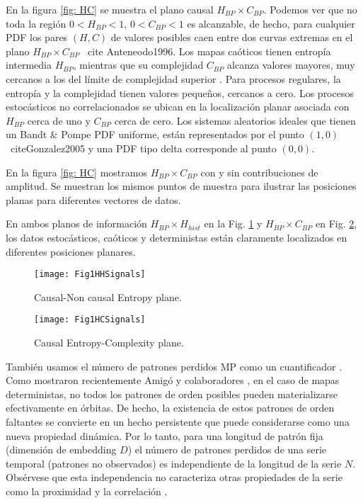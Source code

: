 En la figura \ref{fig: HC} se muestra el plano causal $H_{BP} \times C_{BP}$.
Podemos ver que no toda la región $0 < H_{BP} < 1$, $0 < C_{BP} < 1$ es alcanzable, de hecho, para cualquier PDF los pares $(H, C)$ de valores posibles caen entre dos curvas extremas en el plano $H_{BP} \times C_{BP}$ \ cite {Anteneodo1996}.
Los mapas caóticos tienen entropía intermedia $H_{BP}$, mientras que su complejidad $C_{BP}$ alcanza valores mayores, muy cercanos a los del límite de complejidad superior \cite{Rosso2007, Olivares2012}.
Para procesos regulares, la entropía y la complejidad tienen valores pequeños, cercanos a cero.
Los procesos estocásticos no correlacionados se ubican en la localización planar asociada con $H_{BP}$ cerca de uno y $C_{BP}$ cerca de cero.
Los sistemas aleatorios ideales que tienen un Bandt \& Pompe PDF uniforme, están representados por el punto $(1,0)$ \ cite{Gonzalez2005} y una PDF tipo delta corresponde al punto $(0,0)$.

En la figura \ref{fig: HC} mostramos $H_{BP} \times C_{BP}$ con y sin contribuciones de amplitud.
Se muestran los mismos puntos de muestra para ilustrar las posiciones planas para diferentes vectores de datos.

En ambos planos de información $H_ {BP} \times H_ {hist}$ en la Fig. \ref{fig:HH} y $H_{BP} \times C_{BP}$ en Fig. \ref{fig:HC}, los datos estocásticos, caóticos y deterministas están claramente localizados en diferentes posiciones planares.

\begin{figure}[htpb]
	\centering	
	\texttt{[image: Fig1HHSignals]}
	\caption{Causal-Non causal Entropy plane.}
	\label{fig:HH}
\end{figure}

\begin{figure}[htpb]
	\centering		
	\texttt{[image: Fig1HCSignals]}
	\caption{Causal Entropy-Complexity plane.}
	\label{fig:HC}
\end{figure}

También usamos el número de patrones perdidos MP como un cuantificador \cite {Rosso2012}.
Como mostraron recientemente Amigó y colaboradores \cite{Amigo2006,Amigo2007,Amigo2008,Amigo2010}, en el caso de mapas deterministas, no todos los patrones de orden posibles pueden materializarse efectivamente en órbitas.
De hecho, la existencia de estos patrones de orden faltantes se convierte en un hecho persistente que puede considerarse como una nueva propiedad dinámica.
Por lo tanto, para una longitud de patrón fija (dimensión de embedding $D$) el número de patrones perdidos de una serie temporal (patrones no observados) es independiente de la longitud de la serie $N$.
Obsérvese que esta independencia no caracteriza otras propiedades de la serie como la proximidad y la correlación \cite{Amigo2007,Amigo2010}.

